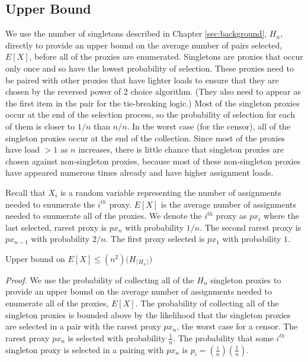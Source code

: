 \subsection{Upper Bound}  

We use the number of singletons described in Chapter \ref{sec:background}, $H_n$, directly to provide an upper bound on the average number of pairs selected, $E[X]$, before all of the proxies are enumerated. Singletons are proxies that occur only once and so have the lowest probability of selection. These proxies need to be paired with other proxies that have lighter loads to ensure that they are chosen by the reversed power of 2 choice algorithm. (They also need to appear as the first item in the pair for the tie-breaking logic.) Most of the singleton proxies occur at the end of the selection process, so the probability of selection for each of them is closer to $1/n$ than $n/n$. In the worst case (for the censor), all of the singleton proxies occur at the end of the collection. Since most of the proxies have load $> 1$ as $n$ increases, there is little chance that singleton proxies are chosen against non-singleton proxies, because most of these non-singleton proxies have appeared numerous times already and have higher assignment loads.

Recall that $X_i$ is a random variable representing the number of assignments needed to enumerate the $i^{th}$ proxy. $E[X]$ is the average number of assignments needed to enumerate all of the proxies. We denote the $i^{th}$ proxy as $px_i$ where the last selected, rarest proxy is $px_{n}$ with probability $1/n$. The second rarest proxy is $px_{n-1}$ with probability $2/n$. The first proxy selected is $px_1$ with probability $1$.\\
 
\label{theorem:UBEX}
\begin{theorem} {Upper bound on $E[X] \leq (n^2) \bigg(H_{\lceil{H_n}\rceil}\bigg)$} 
\end{theorem}

\emph{Proof.} We use the probability of collecting all of the $H_n$ singleton proxies to provide an upper bound on the average number of assignments needed to enumerate all of the proxies, $E[X]$. The probability of collecting all of the singleton proxies is bounded above by the likelihood that the singleton proxies are selected in a pair with the rarest proxy $px_n$, the worst case for a censor. The rarest proxy $px_n$ is selected with probability $\frac{1}{n}$. The probability that some $i^{th}$ singleton proxy is selected in a pairing with $px_n$ is $p_i = (\frac{i}{n})(\frac{1}{n})$. 

